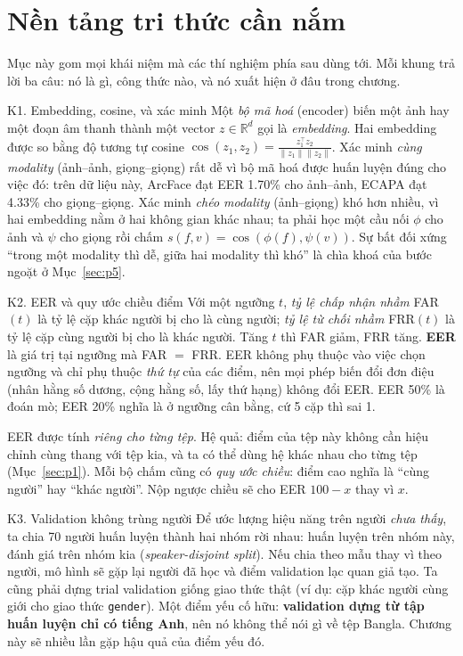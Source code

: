 \documentclass[11pt,a4paper,oneside]{report}
\newcommand{\key}[1]{\textbf{\color{accent}#1}}
\newcommand{\id}[1]{\texttt{#1}}
\begin{document}
\section{Nền tảng tri thức cần nắm}
\label{sec:knowledge}

Mục này gom mọi khái niệm mà các thí nghiệm phía sau dùng tới. Mỗi khung trả lời ba câu: nó là gì, công thức nào, và nó xuất hiện ở đâu trong chương.

\begin{knowledge}{K1. Embedding, cosine, và xác minh}
Một \emph{bộ mã hoá} (encoder) biến một ảnh hay một đoạn âm thanh thành một vector $z\in\mathbb{R}^d$ gọi là \emph{embedding}. Hai embedding được so bằng độ tương tự cosine $\cos(z_1,z_2)=\frac{z_1^\top z_2}{\|z_1\|\|z_2\|}$. Xác minh \emph{cùng modality} (ảnh--ảnh, giọng--giọng) rất dễ vì bộ mã hoá được huấn luyện đúng cho việc đó: trên dữ liệu này, ArcFace đạt EER 1.70\% cho ảnh--ảnh, ECAPA đạt 4.33\% cho giọng--giọng. Xác minh \emph{chéo modality} (ảnh--giọng) khó hơn nhiều, vì hai embedding nằm ở hai không gian khác nhau; ta phải học một cầu nối $\phi$ cho ảnh và $\psi$ cho giọng rồi chấm $s(f,v)=\cos(\phi(f),\psi(v))$. Sự bất đối xứng ``trong một modality thì dễ, giữa hai modality thì khó'' là chìa khoá của bước ngoặt ở Mục~\ref{sec:p5}.
\end{knowledge}

\begin{knowledge}{K2. EER và quy ước chiều điểm}
Với một ngưỡng $t$, \emph{tỷ lệ chấp nhận nhầm} FAR$(t)$ là tỷ lệ cặp khác người bị cho là cùng người; \emph{tỷ lệ từ chối nhầm} FRR$(t)$ là tỷ lệ cặp cùng người bị cho là khác người. Tăng $t$ thì FAR giảm, FRR tăng. \key{EER} là giá trị tại ngưỡng mà FAR $=$ FRR. EER không phụ thuộc vào việc chọn ngưỡng và chỉ phụ thuộc \emph{thứ tự} của các điểm, nên mọi phép biến đổi đơn điệu (nhân hằng số dương, cộng hằng số, lấy thứ hạng) không đổi EER. EER 50\% là đoán mò; EER 20\% nghĩa là ở ngưỡng cân bằng, cứ 5 cặp thì sai 1.

EER được tính \emph{riêng cho từng tệp}. Hệ quả: điểm của tệp này không cần hiệu chỉnh cùng thang với tệp kia, và ta có thể dùng hệ khác nhau cho từng tệp (Mục~\ref{sec:p1}). Mỗi bộ chấm cũng có \emph{quy ước chiều}: điểm cao nghĩa là ``cùng người'' hay ``khác người''. Nộp ngược chiều sẽ cho EER $100-x$ thay vì $x$.
\end{knowledge}

\begin{knowledge}{K3. Validation không trùng người}
Để ước lượng hiệu năng trên người \emph{chưa thấy}, ta chia 70 người huấn luyện thành hai nhóm rời nhau: huấn luyện trên nhóm này, đánh giá trên nhóm kia (\emph{speaker-disjoint split}). Nếu chia theo mẫu thay vì theo người, mô hình sẽ gặp lại người đã học và điểm validation lạc quan giả tạo. Ta cũng phải dựng trial validation giống giao thức thật (ví dụ: cặp khác người cùng giới cho giao thức \id{gender}). Một điểm yếu cố hữu: \textbf{validation dựng từ tập huấn luyện chỉ có tiếng Anh}, nên nó không thể nói gì về tệp Bangla. Chương này sẽ nhiều lần gặp hậu quả của điểm yếu đó.
\end{knowledge}
\end{document}
